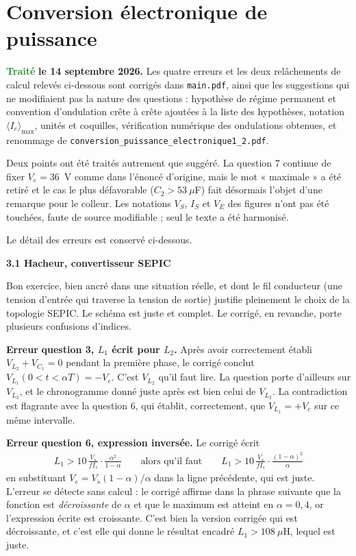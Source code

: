 \documentclass[a4paper,11pt]{article}
\newcommand{\exo}[1]{\vspace{0.7\baselineskip}\noindent\textbf{\large #1}\par\nopagebreak\vspace{0.2\baselineskip}}
\newcommand{\erreur}{\textcolor{BrickRed}{\textbf{Erreur}}}
\newcommand{\traite}{\textcolor{ForestGreen}{\textbf{Traité}}}
\begin{document}
\section{Conversion électronique de puissance}

\traite{} \textbf{le 14 septembre 2026.} Les quatre erreurs et les deux relâchements de calcul
relevés ci-dessous sont corrigés dans \texttt{main.pdf}, ainsi que les suggestions qui ne modifiaient
pas la nature des questions : hypothèse de régime permanent et convention d'ondulation crête à crête
ajoutées à la liste des hypothèses, notation $\langle I_e\rangle_{\max}$, unités et coquilles,
vérification numérique des ondulations obtenues, et renommage de
\texttt{conversion\_puissance\_electronique1\_2.pdf}.

\medskip
Deux points ont été traités autrement que suggéré. La question 7 continue de fixer $V_e=36$~V comme
dans l'énoncé d'origine, mais le mot « maximale » a été retiré et le cas le plus défavorable
($C_2>53~\mu$F) fait désormais l'objet d'une remarque pour le colleur. Les notations $V_S$, $I_S$ et
$V_E$ des figures n'ont pas été touchées, faute de source modifiable ; seul le texte a été harmonisé.

\medskip
Le détail des erreurs est conservé ci-dessous.

\exo{3.1 Hacheur, convertisseur SEPIC}

Bon exercice, bien ancré dans une situation réelle, et dont le fil conducteur (une tension d'entrée
qui traverse la tension de sortie) justifie pleinement le choix de la topologie SEPIC. Le schéma est
juste et complet. Le corrigé, en revanche, porte plusieurs confusions d'indices.

\medskip
\erreur{} \textbf{question 3, $L_1$ écrit pour $L_2$.} Après avoir correctement établi
$V_{L_2}+V_{C_1}=0$ pendant la première phase, le corrigé conclut
$V_{L_1}(0<t<\alpha T)=-V_e$. C'est $V_{L_2}$ qu'il faut lire. La question porte d'ailleurs sur
$V_{L_2}$, et le chronogramme donné juste après est bien celui de $V_{L_2}$. La contradiction est
flagrante avec la question 6, qui établit, correctement, que $V_{L_1}=+V_e$ sur ce même intervalle.

\medskip
\erreur{} \textbf{question 6, expression inversée.} Le corrigé écrit
\begin{align*}
	L_1>10\,\frac{V_s}{fI_s}\cdot\frac{\alpha^2}{1-\alpha}
	\qquad\text{alors qu'il faut}\qquad
	L_1>10\,\frac{V_s}{fI_s}\cdot\frac{(1-\alpha)^2}{\alpha}
\end{align*}
en substituant $V_e=V_s(1-\alpha)/\alpha$ dans la ligne précédente, qui est juste. L'erreur se
détecte sans calcul : le corrigé affirme dans la phrase suivante que la fonction est
\textit{décroissante} de $\alpha$ et que le maximum est atteint en $\alpha=0{,}4$, or l'expression
écrite est croissante. C'est bien la version corrigée qui est décroissante, et c'est elle qui donne
le résultat encadré $L_1>108~\mu$H, lequel est juste.
\end{document}
